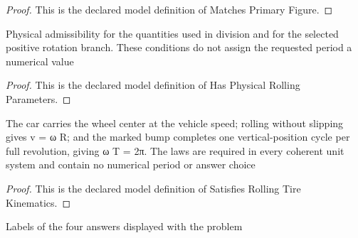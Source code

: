 \begin{proof}
  This is the declared model definition of Matches Primary Figure.
\end{proof}
\begin{definition}
  \label{def:physics:phyx-mini-0225:phyxminiproblems-problemphyxmini0225-hasphysicalrollingparameters}
  Physical admissibility for the quantities used in division and for the selected positive rotation branch. These conditions do not assign the requested period a numerical value
\end{definition}
\begin{proof}
  This is the declared model definition of Has Physical Rolling Parameters.
\end{proof}
\begin{definition}
  \label{def:physics:phyx-mini-0225:phyxminiproblems-problemphyxmini0225-satisfiesrollingtirekinematics}
  The car carries the wheel center at the vehicle speed; rolling without slipping gives v = ω R; and the marked bump completes one vertical-position cycle per full revolution, giving ω T = 2π. The laws are required in every coherent unit system and contain no numerical period or answer choice
\end{definition}
\begin{proof}
  This is the declared model definition of Satisfies Rolling Tire Kinematics.
\end{proof}
\begin{definition}
  \label{def:physics:phyx-mini-0225:phyxminiproblems-problemphyxmini0225-answerchoice}
  Labels of the four answers displayed with the problem
\end{definition}
